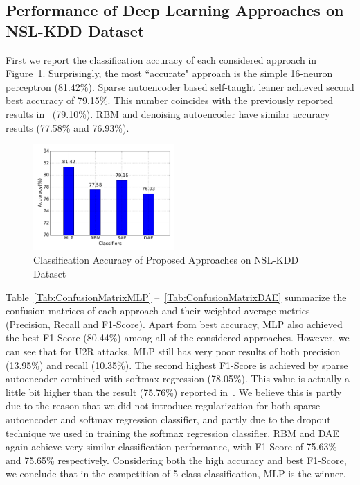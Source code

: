 \subsection{Performance of Deep Learning Approaches on NSL-KDD Dataset}
First we report the classification accuracy of each considered approach in Figure~\ref{Fig:CompAccuracy}.
Surprisingly, the most ``accurate" approach is the simple 16-neuron perceptron (81.42\%).
Sparse autoencoder based self-taught leaner achieved second best accuracy of 79.15\%.
This number coincides with the previously reported results in~\cite{STL-NIDS} (79.10\%).
RBM and denoising autoencoder have similar accuracy results (77.58\% and 76.93\%).

\begin{figure}[h]
    \centering
    \includegraphics[width=0.48\textwidth]{figures/comp_accuracy.pdf}
    \caption{Classification Accuracy of Proposed Approaches on NSL-KDD Dataset}
    \label{Fig:CompAccuracy}
\end{figure}

Table~\ref{Tab:ConfusionMatrixMLP} --~\ref{Tab:ConfusionMatrixDAE} summarize the confusion matrices
of each approach and their weighted average metrics (Precision, Recall and F1-Score).
Apart from best accuracy, MLP also achieved the best F1-Score (80.44\%)
among all of the considered approaches.
However, we can see that for U2R attacks, MLP still has very poor results of
both precision (13.95\%) and recall (10.35\%).
The second highest F1-Score is achieved by sparse autoencoder combined with softmax regression (78.05\%).
This value is actually a little bit higher than the result (75.76\%) reported in~\cite{STL-NIDS}.
We believe this is partly due to the reason that we did not introduce regularization
for both sparse autoencoder and softmax regression classifier,
and partly due to the dropout technique we used in training the softmax regression classifier.
RBM and DAE again achieve very similar classification performance,
with F1-Score of 75.63\% and 75.65\% respectively.
Considering both the high accuracy and best F1-Score, we conclude that in the competition of
5-class classification, MLP is the winner.

